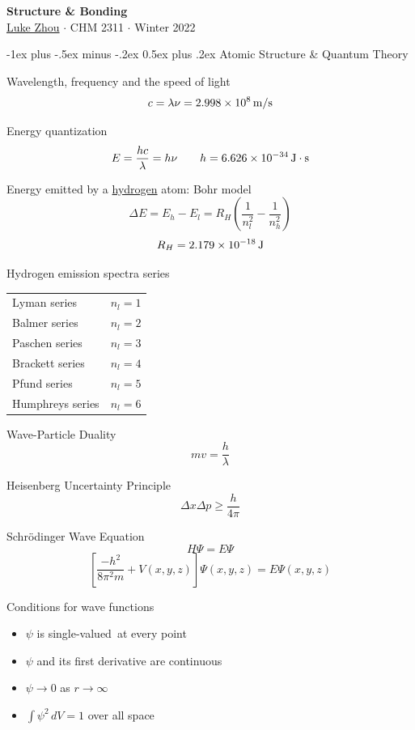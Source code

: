 \documentclass[10pt,landscape]{article}
\makeatletter
\renewcommand{\section}{\@startsection{section}{1}{0mm}%
                                {-1ex plus -.5ex minus -.2ex}%
                                {0.5ex plus .2ex}%
                                {\normalfont\large\bfseries}}
\newcommand{\extraline}{\vspace{1em}}
\newcommand{\tableindent}{\hspace{1.5em}}
\makeatother
\begin{document}
\raggedright
\footnotesize
\begin{multicols}{3}

\setlength{\premulticols}{1pt}
\setlength{\postmulticols}{1pt}
\setlength{\multicolsep}{1pt}
\setlength{\columnsep}{2pt}

\begin{center}
     \Large{\textbf{Structure \& Bonding}} \\
     \small{\href{https://github.com/zhouluke/PhysicsFormulas}{Luke Zhou} $\cdot$ CHM 2311 $\cdot$ Winter 2022}
\end{center}

\section{Atomic Structure \& Quantum Theory}

Wavelength, frequency and the speed of light
\[ c = \lambda\nu  = \SI{2.998E8}{\meter/\second}  \]

Energy quantization
\[E = \frac{hc}{\lambda} = h\nu  \qquad
 h = \SI{6.626E-34}{\joule\cdot\second}  \]

Energy emitted by a \underline{hydrogen} atom: Bohr model
 \[ \Delta E = E_{h} - E_{l} = R_H \left(  \frac{1}{n_l^2} - \frac{1}{n_h^2} \right) \] 
 \[ R_H =  \SI{2.179E-18}{\joule} \]

Hydrogen emission spectra series \\
\begin{tabular}{@{\tableindent}ll@{}}
	Lyman series & $n_l = 1$ \\
	Balmer series & $n_l = 2$ \\
	Paschen series & $n_l = 3$ \\
	Brackett series & $n_l = 4$ \\
	Pfund series & $n_l = 5$ \\
	Humphreys series & $n_l = 6$ \\
\end{tabular}
\extraline

Wave-Particle Duality  
\[  mv = \frac{h}{\lambda} \]


Heisenberg Uncertainty Principle
\[  \Delta x \Delta p \geq \frac{h}{4\pi} \]

Schrödinger Wave Equation
\[ H\Psi = E\Psi  \]
\[ \left[ \frac{-h^2}{8\pi^2m} +
V(x,y,z)\right] \Psi(x,y,z) = E\Psi(x,y,z)  \]
	
Conditions for wave functions
\begin{itemize}
	\item $\psi$ is single-valued at every point
	\item $\psi$ and its first derivative are continuous
	\item $\psi \to 0$ as $r \to \infty$
	\item $\int \psi^2 \, dV = 1$ over all space
\end{itemize}


\end{multicols}
\end{document}
